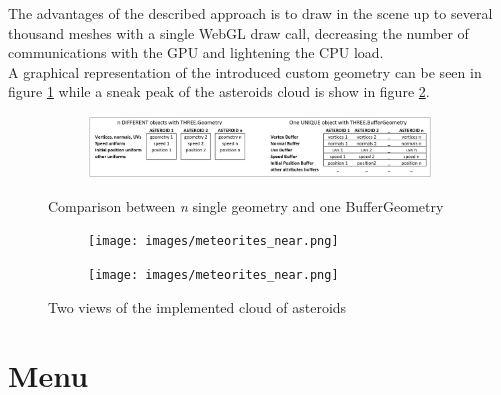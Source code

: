 \documentclass[paper=a4, fontsize=11pt]{scrartcl} %
\numberwithin{equation}{section} %
\numberwithin{figure}{section} %
\numberwithin{table}{section} %
\theoremstyle{definition}
\begin{document}
The advantages of the described approach is to draw in the scene up to several thousand meshes with a single WebGL draw call, decreasing the number of communications with the GPU and lightening the CPU load.\\
A graphical representation of the introduced custom geometry can be seen in figure \ref{fig:buffer_geometry} while a sneak peak of the asteroids cloud is show in figure \ref{fig:meteorites}.

\begin{figure}
	\centering
	\begin{subfigure}{\textwidth}
		\centering
		\includegraphics[width=1.0\linewidth]{images/asteroids_geometry.png}
	\end{subfigure}
	\caption{Comparison between \textit{n} single geometry and one BufferGeometry}
	\label{fig:buffer_geometry}
\end{figure}

\begin{figure}
	\centering
	\begin{subfigure}{.4\textwidth}
		\centering
		\texttt{[image: images/meteorites\_near.png]}
	\end{subfigure}
	\begin{subfigure}{.4\textwidth}
		\centering
		\texttt{[image: images/meteorites\_near.png]}
	\end{subfigure}
	\caption{Two views of the implemented cloud of asteroids}
	\label{fig:meteorites}
\end{figure}

\section{Menu}
\end{document}
